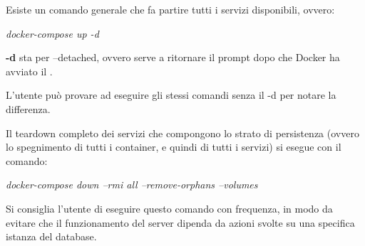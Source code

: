 \documentclass[../manuale-manutentore.tex]{subfiles}
\begin{document}
Esiste un comando generale che fa partire tutti i servizi disponibili, ovvero: \par\bigskip

\begin{center}
  \textit{docker-compose up -d}
\end{center}
\par\bigskip

\textbf{-d}  sta per --detached, ovvero serve a ritornare il prompt dopo che Docker ha avviato il .

L'utente può provare ad eseguire gli stessi comandi senza il -d per notare la differenza.

Il teardown completo dei servizi che compongono lo strato di persistenza (ovvero lo spegnimento di tutti i container, e quindi di tutti i servizi) si esegue con il comando: \par\bigskip

\begin{center}
  \textit{docker-compose down --rmi all --remove-orphans --volumes}
\end{center}
\par\bigskip

Si consiglia l'utente di eseguire questo comando con frequenza, in modo da evitare che il funzionamento del server dipenda da azioni svolte su una specifica istanza del database.
\end{document}
